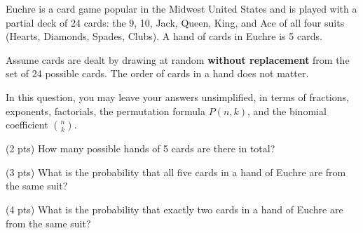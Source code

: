 \documentclass[twoside,12pt]{article}
\begin{document}
\begin{probset}
\begin{prob}[(10 pts)]
\begin{subprobset}
\begin{subprob}
\begin{responsebox}{2.5in}
        \end{responsebox}
\end{subprob}
\end{subprobset}
    
\end{prob}

\newpage

\begin{prob}[(12 pts)]
Euchre is a card game popular in the Midwest United States and is played with a partial deck of 24 cards: the 9, 10, Jack, Queen, King, and Ace of all four suits (Hearts, Diamonds, Spades, Clubs). A hand of cards in Euchre is 5 cards.

Assume cards are dealt by drawing at random \textbf{without replacement} from the set of 24 possible cards. The order of cards in a hand does not matter.

In this question, you may leave your answers unsimplified, in terms of fractions, exponents, factorials, the permutation formula $P(n, k)$, and the binomial coefficient ${n \choose k}$.


\begin{subprobset}
    \begin{subprob}(2 pts)
        How many possible hands of 5 cards are there in total?

        \begin{responsebox}{0.9in}
            
        \end{responsebox}
    \end{subprob}

    
    \begin{subprob}(3 pts)
        What is the probability that all five cards in a hand of Euchre are from the same suit?

        \begin{responsebox}{0.9in}
            
        \end{responsebox}
    \end{subprob}
    
    \begin{subprob}(4 pts)
        What is the probability that exactly two cards in a hand of Euchre are from the same suit?

        \begin{responsebox}{0.9in}
            
        \end{responsebox}
    \end{subprob}


\end{subprobset}
\end{prob}
\end{probset}
\end{document}

